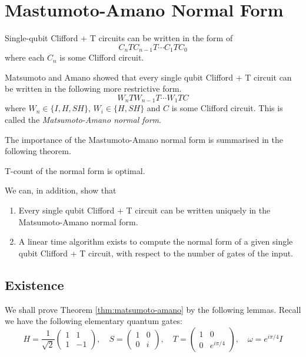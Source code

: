 \section{Mastumoto-Amano Normal Form}

Single-qubit Clifford + T circuits can be written in the form of 
$$
	C_n T C_{n-1} T \cdots C_1 T C_0
$$
where each $C_n$ is some Clifford circuit.

Matsumoto and Amano \cite{matsumoto} showed that every single qubit Clifford + T circuit can be written in the following more restrictive form. 
$$
	W_n T W_{n-1} T \cdots W_1 T C
$$
where $W_n \in \{I, H, SH\}$, $W_i \in \{H, SH\}$ and $C$ is some Clifford circuit.
This is called the \textit{Matsumoto-Amano normal form}.

The importance of the Mastumoto-Amano normal form is summarised in the following theorem.

\begin{theorem}\label{thm:matsumoto-amano}
	T-count of the normal form is optimal.
\end{theorem}

We can, in addition, show that 
\begin{lemma}
\begin{enumerate}
		\item Every single qubit Clifford + T circuit can be written uniquely in the Matsumoto-Amano normal form. 
		\item A linear time algorithm exists to compute the normal form of a given single qubit Clifford + T circuit, with respect to the number of gates of the input.
	\end{enumerate}
\end{lemma}

\subsection{Existence}

We shall prove Theorem \ref{thm:matsumoto-amano} by the following lemmas.
Recall we have the following elementary quantum gates:
$$
H = \frac{1}{\sqrt{2}}\begin{pmatrix}
1 & 1 \\
1 & -1
\end{pmatrix}, \quad S = \begin{pmatrix}
1 & 0 \\
0 & i
\end{pmatrix}, \quad T = \begin{pmatrix}
1 & 0 \\
0 & e^{i\pi/4}
\end{pmatrix}, \quad \omega = e^{i\pi/4} I
$$

